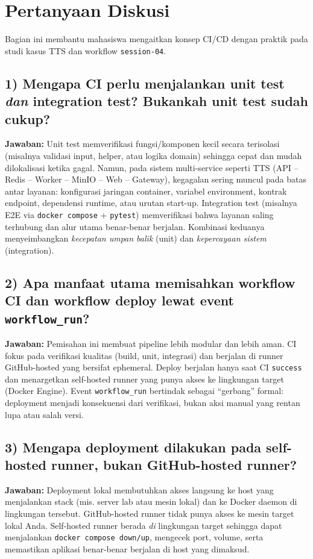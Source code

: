 \section{Pertanyaan Diskusi}

Bagian ini membantu mahasiswa mengaitkan konsep CI/CD dengan praktik pada studi kasus TTS dan workflow \texttt{session-04}.

\subsection*{1) Mengapa CI perlu menjalankan unit test \emph{dan} integration test? Bukankah unit test sudah cukup?}
\textbf{Jawaban:} Unit test memverifikasi fungsi/komponen kecil secara terisolasi (misalnya validasi input, helper, atau logika domain) sehingga cepat dan mudah dilokalisasi ketika gagal. Namun, pada sistem multi-service seperti TTS (API -- Redis -- Worker -- MinIO -- Web -- Gateway), kegagalan sering muncul pada batas antar layanan: konfigurasi jaringan container, variabel environment, kontrak endpoint, dependensi runtime, atau urutan start-up. Integration test (misalnya E2E via \texttt{docker compose} + \texttt{pytest}) memverifikasi bahwa layanan saling terhubung dan alur utama benar-benar berjalan. Kombinasi keduanya menyeimbangkan \emph{kecepatan umpan balik} (unit) dan \emph{kepercayaan sistem} (integration).

\subsection*{2) Apa manfaat utama memisahkan workflow CI dan workflow deploy lewat event \texttt{workflow\_run}?}
\textbf{Jawaban:} Pemisahan ini membuat pipeline lebih modular dan lebih aman. CI fokus pada verifikasi kualitas (build, unit, integrasi) dan berjalan di runner GitHub-hosted yang bersifat ephemeral. Deploy berjalan hanya saat CI \texttt{success} dan menargetkan self-hosted runner yang punya akses ke lingkungan target (Docker Engine). Event \texttt{workflow\_run} bertindak sebagai ``gerbang'' formal: deployment menjadi konsekuensi dari verifikasi, bukan aksi manual yang rentan lupa atau salah versi.

\subsection*{3) Mengapa deployment dilakukan pada self-hosted runner, bukan GitHub-hosted runner?}
\textbf{Jawaban:} Deployment lokal membutuhkan akses langsung ke host yang menjalankan stack (mis. server lab atau mesin lokal) dan ke Docker daemon di lingkungan tersebut. GitHub-hosted runner tidak punya akses ke mesin target lokal Anda. Self-hosted runner berada \emph{di} lingkungan target sehingga dapat menjalankan \texttt{docker compose down/up}, mengecek port, volume, serta memastikan aplikasi benar-benar berjalan di host yang dimaksud.

